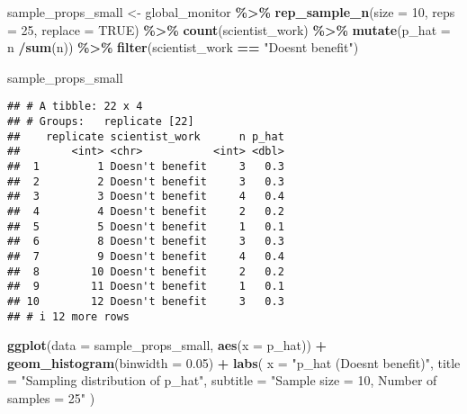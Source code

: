 \documentclass[
]{article}
\newenvironment{Shaded}{\begin{snugshade}}{\end{snugshade}}
\newcommand{\AttributeTok}[1]{\textcolor[rgb]{0.13,0.29,0.53}{#1}}
\newcommand{\ConstantTok}[1]{\textcolor[rgb]{0.56,0.35,0.01}{#1}}
\newcommand{\DecValTok}[1]{\textcolor[rgb]{0.00,0.00,0.81}{#1}}
\newcommand{\FloatTok}[1]{\textcolor[rgb]{0.00,0.00,0.81}{#1}}
\newcommand{\FunctionTok}[1]{\textcolor[rgb]{0.13,0.29,0.53}{\textbf{#1}}}
\newcommand{\NormalTok}[1]{#1}
\newcommand{\OtherTok}[1]{\textcolor[rgb]{0.56,0.35,0.01}{#1}}
\newcommand{\SpecialCharTok}[1]{\textcolor[rgb]{0.81,0.36,0.00}{\textbf{#1}}}
\newcommand{\StringTok}[1]{\textcolor[rgb]{0.31,0.60,0.02}{#1}}
\begin{document}
\begin{Shaded}
\begin{Highlighting}[]
\NormalTok{sample\_props\_small }\OtherTok{\textless{}{-}}\NormalTok{ global\_monitor }\SpecialCharTok{\%\textgreater{}\%}
                    \FunctionTok{rep\_sample\_n}\NormalTok{(}\AttributeTok{size =} \DecValTok{10}\NormalTok{, }\AttributeTok{reps =} \DecValTok{25}\NormalTok{, }\AttributeTok{replace =} \ConstantTok{TRUE}\NormalTok{) }\SpecialCharTok{\%\textgreater{}\%}
                    \FunctionTok{count}\NormalTok{(scientist\_work) }\SpecialCharTok{\%\textgreater{}\%}
                    \FunctionTok{mutate}\NormalTok{(}\AttributeTok{p\_hat =}\NormalTok{ n }\SpecialCharTok{/}\FunctionTok{sum}\NormalTok{(n)) }\SpecialCharTok{\%\textgreater{}\%}
                    \FunctionTok{filter}\NormalTok{(scientist\_work }\SpecialCharTok{==} \StringTok{"Doesn\textquotesingle{}t benefit"}\NormalTok{)}
\end{Highlighting}
\end{Shaded}

\begin{Shaded}
\begin{Highlighting}[]
\NormalTok{sample\_props\_small}
\end{Highlighting}
\end{Shaded}

\begin{verbatim}
## # A tibble: 22 x 4
## # Groups:   replicate [22]
##    replicate scientist_work      n p_hat
##        <int> <chr>           <int> <dbl>
##  1         1 Doesn't benefit     3   0.3
##  2         2 Doesn't benefit     3   0.3
##  3         3 Doesn't benefit     4   0.4
##  4         4 Doesn't benefit     2   0.2
##  5         5 Doesn't benefit     1   0.1
##  6         8 Doesn't benefit     3   0.3
##  7         9 Doesn't benefit     4   0.4
##  8        10 Doesn't benefit     2   0.2
##  9        11 Doesn't benefit     1   0.1
## 10        12 Doesn't benefit     3   0.3
## # i 12 more rows
\end{verbatim}

\begin{Shaded}
\begin{Highlighting}[]
\FunctionTok{ggplot}\NormalTok{(}\AttributeTok{data =}\NormalTok{ sample\_props\_small, }\FunctionTok{aes}\NormalTok{(}\AttributeTok{x =}\NormalTok{ p\_hat)) }\SpecialCharTok{+}
  \FunctionTok{geom\_histogram}\NormalTok{(}\AttributeTok{binwidth =} \FloatTok{0.05}\NormalTok{) }\SpecialCharTok{+}
  \FunctionTok{labs}\NormalTok{(}
    \AttributeTok{x =} \StringTok{"p\_hat (Doesn\textquotesingle{}t benefit)"}\NormalTok{,}
    \AttributeTok{title =} \StringTok{"Sampling distribution of p\_hat"}\NormalTok{,}
    \AttributeTok{subtitle =} \StringTok{"Sample size = 10, Number of samples = 25"}
\NormalTok{  )}
\end{Highlighting}
\end{Shaded}
\end{document}
